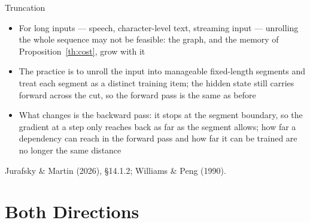 \documentclass[aspectratio=169, 11pt]{beamer}
\newcommand{\srcline}[1]{%
  \par\vspace{0.25em}%
  {\scriptsize\color{mcMuted}\hfill #1\par}}
\begin{document}
\begin{frame}{Truncation}
  \vspace{0.05em}
  {\footnotesize
  \begin{itemize}\itemsep0.3em
    \item For long inputs --- speech, character-level text, streaming
          input --- unrolling the whole sequence may not be feasible:
          the graph, and the memory of Proposition~\ref{th:cost}, grow
          with it
    \item The practice is to unroll the input into manageable
          \alert{fixed-length segments} and treat each segment as a
          distinct training item; the hidden state still carries forward
          across the cut, so the forward pass is the same as before
    \item What changes is the backward pass: it stops at the segment
          boundary, so the gradient at a step only reaches back as far as
          the segment allows; how far a dependency can reach in the
          forward pass and how far it can be trained are no longer the
          same distance
  \end{itemize}}
  \srcline{Jurafsky \& Martin (2026), \S14.1.2; Williams \& Peng (1990).}
\end{frame}

\section{Both Directions}
\end{document}
